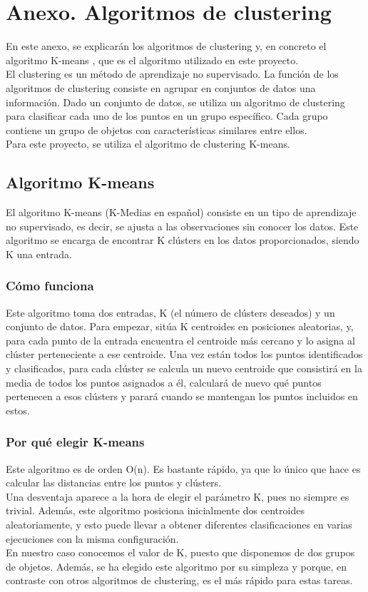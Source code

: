 
\section{Anexo. Algoritmos de clustering}
\label{clustering}

\noindent En este anexo, se explicarán los algoritmos de clustering y, en concreto el algoritmo K-means \cite{hartigan1979algorithm}, que es el algoritmo utilizado en este proyecto. \\

\noindent El clustering es un método de aprendizaje no supervisado. La función de los algoritmos de clustering consiste en agrupar en conjuntos de datos una información. Dado un conjunto de datos, se utiliza un algoritmo de clustering para clasificar cada uno de los puntos en un grupo específico. Cada grupo contiene un grupo de objetos con características similares entre ellos. \\

\noindent Para este proyecto, se utiliza el algoritmo de clustering K-means.

\subsection{Algoritmo K-means}
\noindent El algoritmo K-means (K-Medias en español) consiste en un tipo de aprendizaje no supervisado, es decir, se ajusta a las observaciones sin conocer los datos. Este algoritmo se encarga de encontrar K clústers en los datos proporcionados, siendo K una entrada. 

\subsubsection{Cómo funciona}
\noindent Este algoritmo toma dos entradas, K (el número de clústers deseados) y un conjunto de datos. Para empezar, sitúa K centroides en posiciones aleatorias, y, para cada punto de la entrada encuentra el centroide más cercano y lo asigna al clúster perteneciente a ese centroide. Una vez están todos los puntos identificados y clasificados, para cada clúster se calcula un nuevo centroide que consistirá en la media de todos los puntos asignados a él, calculará de nuevo qué puntos pertenecen a esos clústers y parará cuando se mantengan los puntos incluidos en estos.

\subsubsection{Por qué elegir K-means}
\noindent Este algoritmo es de orden O(n). Es bastante rápido, ya que lo único que hace es calcular las distancias entre los puntos y clústers. \\
\noindent Una desventaja aparece a la hora de elegir el parámetro K, pues no siempre es trivial. Además, este algoritmo posiciona inicialmente dos centroides aleatoriamente, y esto puede llevar a obtener diferentes clasificaciones en varias ejecuciones con la misma configuración.\\

\noindent En nuestro caso conocemos el valor de K, puesto que disponemos de dos grupos de objetos. Además, se ha elegido este algoritmo por su simpleza y porque, en contraste con otros algoritmos de clustering, es el más rápido para estas tareas.